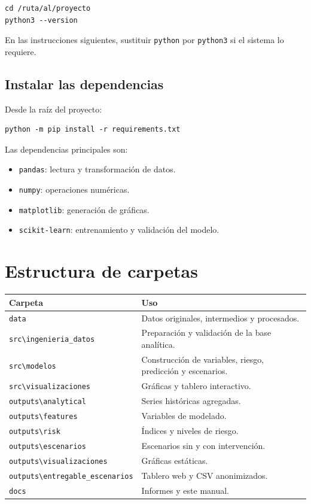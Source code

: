 \documentclass[11pt,a4paper]{article}
\newcommand{\ruta}[1]{\texttt{\small #1}}
\newcommand{\comando}[1]{\texttt{\small #1}}
\begin{document}
\begin{lstlisting}[style=terminal]
cd /ruta/al/proyecto
python3 --version
\end{lstlisting}

En las instrucciones siguientes, sustituir \comando{python} por \comando{python3} si el sistema lo requiere.

\subsection{Instalar las dependencias}

Desde la raíz del proyecto:

\begin{lstlisting}[style=terminal]
python -m pip install -r requirements.txt
\end{lstlisting}

Las dependencias principales son:

\begin{itemize}
    \item \texttt{pandas}: lectura y transformación de datos.
    \item \texttt{numpy}: operaciones numéricas.
    \item \texttt{matplotlib}: generación de gráficas.
    \item \texttt{scikit-learn}: entrenamiento y validación del modelo.
\end{itemize}

\section{Estructura de carpetas}

\begin{longtable}{p{}p{}}
\toprule
\textbf{Carpeta} & \textbf{Uso}\\
\midrule
\ruta{data} & Datos originales, intermedios y procesados.\\
\ruta{src\textbackslash ingenieria\_datos} & Preparación y validación de la base analítica.\\
\ruta{src\textbackslash modelos} & Construcción de variables, riesgo, predicción y escenarios.\\
\ruta{src\textbackslash visualizaciones} & Gráficas y tablero interactivo.\\
\ruta{outputs\textbackslash analytical} & Series históricas agregadas.\\
\ruta{outputs\textbackslash features} & Variables de modelado.\\
\ruta{outputs\textbackslash risk} & Índices y niveles de riesgo.\\
\ruta{outputs\textbackslash escenarios} & Escenarios sin y con intervención.\\
\ruta{outputs\textbackslash visualizaciones} & Gráficas estáticas.\\
\ruta{outputs\textbackslash entregable\_escenarios} & Tablero web y CSV anonimizados.\\
\ruta{docs} & Informes y este manual.\\
\bottomrule
\end{longtable}
\end{document}
